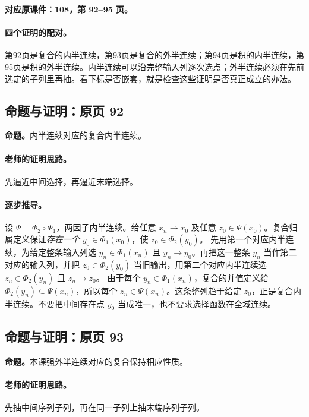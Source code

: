 \textbf{对应原课件：108，第 92--95 页。}


\paragraph{四个证明的配对。}
第92页是复合的内半连续，第93页是复合的外半连续；第94页是积的内半连续，第95页是积的外半连续。内半连续可以沿完整输入列逐次选点；外半连续必须在先前选定的子列里再抽。看下标是否嵌套，就是检查这些证明是否真正成立的办法。


\subsection{命题与证明：原页 92}

\textbf{命题。}内半连续对应的复合内半连续。

\paragraph{老师的证明思路。}先逼近中间选择，再逼近末端选择。

\paragraph{逐步推导。}
设 $\Psi=\Phi_2\circ\Phi_1$，两因子内半连续。给任意 $x_n\to x_0$ 及任意 $z_0\in\Psi(x_0)$。复合归属定义保证\emph{存在一个} $y_0\in\Phi_1(x_0)$，使 $z_0\in\Phi_2(y_0)$。
先用第一个对应内半连续，为给定整条输入列选 $y_n\in\Phi_1(x_n)$ 且 $y_n\to y_0$。再把这一整条 $y_n$ 当作第二对应的输入列，并把 $z_0\in\Phi_2(y_0)$ 当旧输出，用第二个对应内半连续选 $z_n\in\Phi_2(y_n)$ 且 $z_n\to z_0$。
由于每个 $y_n\in\Phi_1(x_n)$，复合的并值定义给 $\Phi_2(y_n)\subseteq\Psi(x_n)$，所以每个 $z_n\in\Psi(x_n)$。这条整列趋于给定 $z_0$，正是复合内半连续。不要把中间存在点 $y_0$ 当成唯一，也不要求选择函数在全域连续。


\subsection{命题与证明：原页 93}

\textbf{命题。}本课强外半连续对应的复合保持相应性质。

\paragraph{老师的证明思路。}先抽中间序列子列，再在同一子列上抽末端序列子列。

